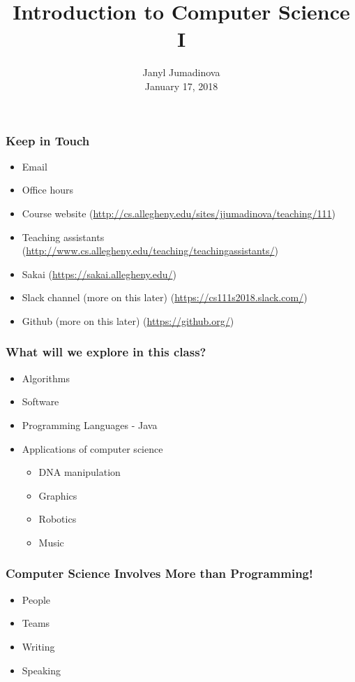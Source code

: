 \documentclass{beamer}
\title{Introduction to Computer Science I}
\author{Janyl Jumadinova \\ January 17, 2018}
\begin{document}
\begin{frame}
  \titlepage
\end{frame}

\begin{frame}
  \frametitle{Keep in Touch}
	\begin{itemize}
        \item Email
		\item Office hours
		\item Course website (\url{http://cs.allegheny.edu/sites/jjumadinova/teaching/111})
		\item Teaching assistants (\url{http://www.cs.allegheny.edu/teaching/teachingassistants/})
		\item Sakai (\url{https://sakai.allegheny.edu/})
		\item Slack channel (more on this later) (\url{https://cs111s2018.slack.com/})
		\item Github (more on this later) (\url{https://github.org/})
    \end{itemize}
\end{frame}

\begin{frame}
  \frametitle{What will we explore in this class?}
		\pause
      \begin{itemize}
        \item Algorithms
        \item Software 
        \item Programming Languages - Java
        \item Applications of computer science \pause
        \begin{itemize}
        	\item DNA manipulation
        	\item Graphics
        	\item Robotics 
        	\item Music
    	\end{itemize}
    \end{itemize}
\end{frame}

\begin{frame}
  \frametitle{Computer Science Involves More than Programming!}
	\begin{itemize}
		\item People
        \item Teams
        \item Writing
        \item Speaking
    \end{itemize}
\end{frame}
\end{document}
